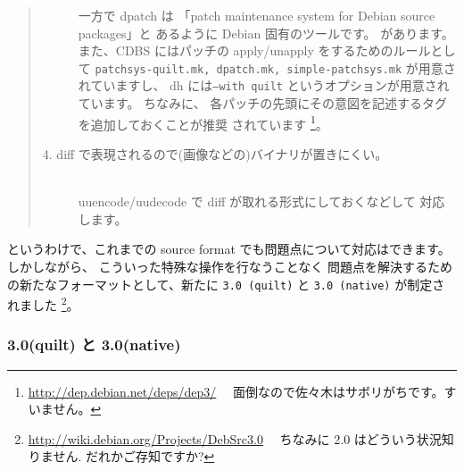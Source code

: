 \documentclass[mingoth,a4paper]{jsarticle}
\begin{document}
\begin{quote}
\begin{description}
{          一方で dpatch は
          「patch maintenance system for Debian source packages」と
          あるように Debian 固有のツールです。
        }
        があります。
        また、CDBS にはパッチの apply/unapply をするためのルールとして
        {\tt patchsys-quilt.mk, dpatch.mk, simple-patchsys.mk}
        が用意されていますし、
        dh には{\tt --with quilt} というオプションが用意されています。
        ちなみに、
        各パッチの先頭にその意図を記述するタグを追加しておくことが推奨
        されています
        \footnote{\url{http://dep.debian.net/deps/dep3/}　
          面倒なので佐々木はサボリがちです。すいません。}。
          \item[4. diff で表現されるので(画像などの)バイナリが置きにくい。]　\\
        uuencode/uudecode で diff が取れる形式にしておくなどして
         対応します。
    \end{description}
\end{quote}

というわけで、これまでの source format でも問題点について対応はできます。
しかしながら、
こういった特殊な操作を行なうことなく
問題点を解決するための新たなフォーマットとして、新たに
{\tt 3.0 (quilt)} と {\tt 3.0 (native)} が制定されました%
\footnote{%
  \url{http://wiki.debian.org/Projects/DebSrc3.0}　
  ちなみに 2.0 はどういう状況知りません. だれかご存知ですか?
}。

\subsubsection{3.0(quilt) と 3.0(native)}
\end{document}
